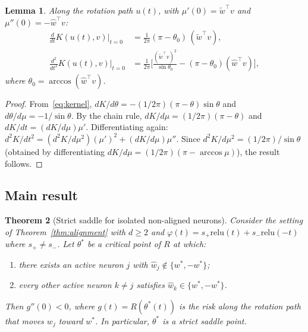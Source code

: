 \documentclass[11pt]{amsart}
\newtheorem{theorem}{Theorem}[section]
\newtheorem{lemma}[theorem]{Lemma}
\theoremstyle{definition}
\newcommand{\relu}{\mathrm{relu}}
\begin{document}
\begin{lemma}\label{lem:kernel-deriv}
Along the rotation path $u(t)$, with $\mu'(0) = \tilde{w}^\top v$ and
$\mu''(0) = -\hat{w}^\top v$:
\begin{align}
  \frac{d}{dt}K(u(t),v)\Big|_{t=0}
  &= \frac{1}{2\pi}(\pi - \theta_0)\,(\tilde{w}^\top v),
  \label{eq:dK}\\[4pt]
  \frac{d^2}{dt^2}K(u(t),v)\Big|_{t=0}
  &= \frac{1}{2\pi}\biggl[
    \frac{(\tilde{w}^\top v)^2}{\sin\theta_0}
    - (\pi - \theta_0)(\hat{w}^\top v)
  \biggr],
  \label{eq:d2K}
\end{align}
where $\theta_0 = \arccos(\hat{w}^\top v)$.
\end{lemma}

\begin{proof}
From~\eqref{eq:kernel}, $dK/d\theta = -(1/2\pi)(\pi-\theta)\sin\theta$
and $d\theta/d\mu = -1/\sin\theta$.  By the chain rule,
$dK/d\mu = (1/2\pi)(\pi-\theta)$ and $dK/dt = (dK/d\mu)\mu'$.  Differentiating
again: $d^2K/dt^2 = (d^2K/d\mu^2)(\mu')^2 + (dK/d\mu)\mu''$.  Since
$d^2K/d\mu^2 = (1/2\pi)/\sin\theta$ (obtained by differentiating
$dK/d\mu = (1/2\pi)(\pi - \arccos\mu)$), the result follows.
\end{proof}

\subsection{Main result}

\begin{theorem}[Strict saddle for isolated non-aligned neurons]\label{thm:saddle}
Consider the setting of Theorem~\ref{thm:alignment} with $d \geq 2$ and
$\varphi(t) = s_+\relu(t) + s_-\relu(-t)$ where $s_+ \neq s_-$.
Let $\theta^*$ be a critical point of $R$ at which:
\begin{enumerate}[label=(\roman*)]
  \item there exists an active neuron $j$ with $\hat{w}_j \notin \{w^*, -w^*\}$;
  \item every other active neuron $k \neq j$ satisfies
    $\hat{w}_k \in \{w^*, -w^*\}$.
\end{enumerate}
Then $g''(0) < 0$, where $g(t) = R(\theta^*(t))$ is the risk along the rotation
path that moves $w_j$ toward $w^*$.  In particular, $\theta^*$ is a strict
saddle point.
\end{theorem}
\end{document}
